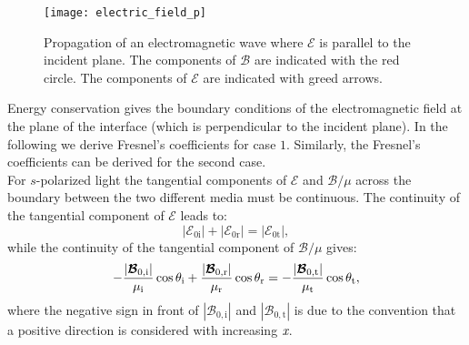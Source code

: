 \begin{figure}[h]
 \label{fig:electric_field_p}
     \begin{center}
     \texttt{[image: electric\_field\_p]}
     \end{center}
 \caption{Propagation of an electromagnetic wave where $\boldsymbol{\mathcal{E}}$ is parallel to the incident plane. The components of $\boldsymbol{\mathcal{B}}$ are indicated with the red circle.
The components of $\boldsymbol{\mathcal{E}}$ are indicated with greed arrows.}
\label{fig:electric_field_p}
 \end{figure}
Energy conservation gives the boundary conditions of the electromagnetic field at the plane of the interface (which is perpendicular to the incident plane). In the following we derive Fresnel's coefficients for case $1$. Similarly, the Fresnel's coefficients can be derived for the second case.\\ 
\indent For $s$-polarized light the tangential components of $\boldsymbol{\mathcal{E}}$ and $\boldsymbol{\mathcal{B}}/\mu$ across the boundary between the two different media must be continuous. The continuity of the tangential component of $\boldsymbol{\mathcal{E}}$ leads to:
\begin{equation}\label{Econservation}
|\boldsymbol{\mathcal{E}}_{0\textrm{i}}|+|\boldsymbol{\mathcal{E}}_{0\textrm{r}}|= |\boldsymbol{\mathcal{E}}_{0\textrm{t}}|,
\end{equation} 
while the continuity of the tangential component of $\boldsymbol{\mathcal{B}}/\mu$ gives:
\begin{equation}\label{Bconservation}
-\frac{|\boldsymbol{\mathcal{B}}_{0,\textrm{i}}|}{\mu_\textrm{i}}\cos\theta_{\textrm{i}}+\frac{|\boldsymbol{\mathcal{B}}_{0,\textrm{r}}|}{\mu_\textrm{r}}\cos\theta_{\textrm{r}} = 
-\frac{|\boldsymbol{\mathcal{B}}_{0,\textrm{t}}|}{\mu_\textrm{t}}\cos\theta_{\textrm{t}},
\end{equation}
where the negative sign in front of $|\boldsymbol{\mathcal{B}}_{0,\textrm{i}}|$ and $|\boldsymbol{\mathcal{B}}_{0,\textrm{t}}|$ is due to the convention that a positive direction is considered with increasing $\textit{x}$.
